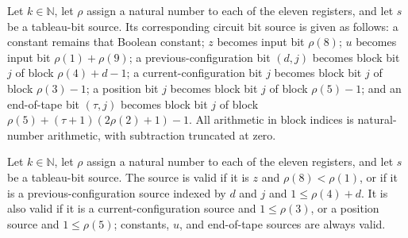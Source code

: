 \begin{definition}
\label{Complexity.UTab.SSrc.toBitSrc}
\leanok
{}
Let $k\in\mathbb N$, let $\rho$ assign a natural number to each of the eleven registers,
and let $s$ be a tableau-bit source. Its corresponding circuit bit source is given as
follows: a constant remains that Boolean constant; $z$ becomes input bit $\rho(8)$; $u$
becomes input bit $\rho(1)+\rho(9)$; a previous-configuration bit $(d,j)$ becomes block
bit $j$ of block $\rho(4)+d-1$; a current-configuration bit $j$ becomes block bit $j$ of
block $\rho(3)-1$; a position bit $j$ becomes block bit $j$ of block $\rho(5)-1$; and an
end-of-tape bit $(\tau,j)$ becomes block bit $j$ of block
$\rho(5)+(\tau+1)(2\rho(2)+1)-1$. All arithmetic in block indices is natural-number
arithmetic, with subtraction truncated at zero.
\end{definition}

\begin{definition}
\label{Complexity.UTab.SSrc.Ok}
\leanok
{}
Let $k\in\mathbb N$, let $\rho$ assign a natural number to each of the eleven registers,
and let $s$ be a tableau-bit source. The source is valid if it is $z$ and
$\rho(8)<\rho(1)$, or if it is a previous-configuration source indexed by $d$ and $j$
and $1\leq\rho(4)+d$. It is also valid if it is a current-configuration source and
$1\leq\rho(3)$, or a position source and $1\leq\rho(5)$; constants, $u$, and end-of-tape
sources are always valid.
\end{definition}

